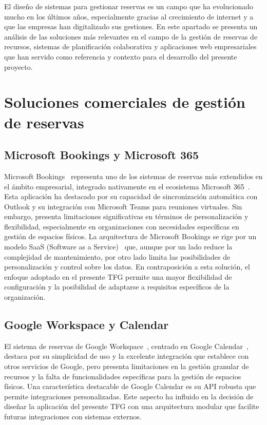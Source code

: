
El diseño de sistemas para gestionar reservas es un campo que ha evolucionado mucho en los últimos años, especialmente gracias al crecimiento de internet y a que las empresas han digitalizado sus gestiones. En este apartado se presenta un análisis de las soluciones más relevantes en el campo de la gestión de reservas de recursos, sistemas de planificación colaborativa y aplicaciones web empresariales que han servido como referencia y contexto para el desarrollo del presente proyecto.

\section{Soluciones comerciales de gestión de reservas}\label{soluciones-comerciales-gestion-reservas}
\subsection{Microsoft Bookings y Microsoft 365}\label{microsoft-booking-microsoft-365}
Microsoft Bookings~\cite{microsoft-booking} representa uno de los sistemas de reservas más extendidos en el ámbito empresarial, integrado nativamente en el ecosistema Microsoft 365~\cite{microsoft-365}. Esta aplicación ha destacado por su capacidad de sincronización automática con Outlook y su integración con Microsoft Teams para reuniones virtuales. Sin embargo, presenta limitaciones significativas en términos de personalización y flexibilidad, especialmente en organizaciones con necesidades específicas en gestión de espacios físicos.
La arquitectura de Microsoft Bookings se rige por un modelo SaaS (Software as a Service)~\cite{saas} que, aunque por un lado reduce la complejidad de mantenimiento, por otro lado limita las posibilidades de personalización y control sobre los datos. En contraposición a esta solución, el enfoque adoptado en el presente TFG permite una mayor flexibilidad de configuración y la posibilidad de adaptarse a requisitos específicos de la organización.

\subsection{Google Workspace y Calendar}\label{google-workspace-calendar}
El sistema de reservas de Google Workspace~\cite{google-workspace}, centrado en Google Calendar~\cite{google-calendar}, destaca por su simplicidad de uso y la excelente integración que establece con otros servicios de Google, pero presenta limitaciones en la gestión granular de recursos y la falta de funcionalidades específicas para la gestión de espacios físicos.
Una característica destacable de Google Calendar es su API robusta que permite integraciones personalizadas. Este aspecto ha influido en la decisión de diseñar la aplicación del presente TFG con una arquitectura modular que facilite futuras integraciones con sistemas externos.

